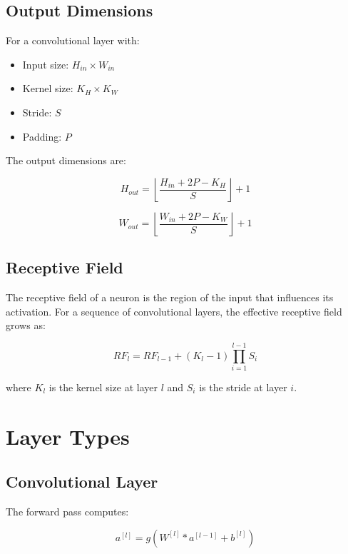 \documentclass[12pt,a4paper]{article}
\begin{document}
\subsection{Output Dimensions}

For a convolutional layer with:
\begin{itemize}
    \item Input size: $H_{in} \times W_{in}$
    \item Kernel size: $K_H \times K_W$
    \item Stride: $S$
    \item Padding: $P$
\end{itemize}

The output dimensions are:

\begin{equation}
H_{out} = \left\lfloor \frac{H_{in} + 2P - K_H}{S} \right\rfloor + 1
\end{equation}

\begin{equation}
W_{out} = \left\lfloor \frac{W_{in} + 2P - K_W}{S} \right\rfloor + 1
\end{equation}

\subsection{Receptive Field}

The receptive field of a neuron is the region of the input that influences its activation. For a sequence of convolutional layers, the effective receptive field grows as:

\begin{equation}
RF_l = RF_{l-1} + (K_l - 1) \prod_{i=1}^{l-1} S_i
\end{equation}

where $K_l$ is the kernel size at layer $l$ and $S_i$ is the stride at layer $i$.

\section{Layer Types}

\subsection{Convolutional Layer}

The forward pass computes:

\begin{equation}
a^{[l]} = g(W^{[l]} * a^{[l-1]} + b^{[l]})
\end{equation}
\end{document}
